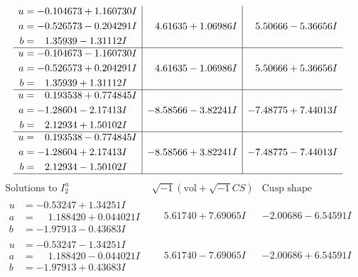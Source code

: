 \documentclass[1p]{elsarticle_modified}
\theoremstyle{definition}
\newcommand{\I}{\sqrt{-1}}
\begin{document}
$$\begin{array}{c|c|c}
\begin{aligned}
u &= -0.104673 + 1.160730 I \\
a &= -0.526573 - 0.204291 I \\
b &= \phantom{-}1.35939 - 1.31112 I\end{aligned}
 & \phantom{-}4.61635 + 1.06986 I & \phantom{-}5.50666 - 5.36656 I \\ \hline\begin{aligned}
u &= -0.104673 - 1.160730 I \\
a &= -0.526573 + 0.204291 I \\
b &= \phantom{-}1.35939 + 1.31112 I\end{aligned}
 & \phantom{-}4.61635 - 1.06986 I & \phantom{-}5.50666 + 5.36656 I \\ \hline\begin{aligned}
u &= \phantom{-}0.193538 + 0.774845 I \\
a &= -1.28604 - 2.17413 I \\
b &= \phantom{-}2.12934 + 1.50102 I\end{aligned}
 & -8.58566 - 3.82241 I & -7.48775 + 7.44013 I \\ \hline\begin{aligned}
u &= \phantom{-}0.193538 - 0.774845 I \\
a &= -1.28604 + 2.17413 I \\
b &= \phantom{-}2.12934 - 1.50102 I\end{aligned}
 & -8.58566 + 3.82241 I & -7.48775 - 7.44013 I\\
 \hline 
 \end{array}$$\newpage$$\begin{array}{c|c|c}  
\text{Solutions to }I^u_{2}& \I (\text{vol} + \sqrt{-1}CS) & \text{Cusp shape}\\
 \hline 
\begin{aligned}
u &= -0.53247 + 1.34251 I \\
a &= \phantom{-}1.188420 + 0.044021 I \\
b &= -1.97913 - 0.43683 I\end{aligned}
 & \phantom{-}5.61740 + 7.69065 I & -2.00686 - 6.54591 I \\ \hline\begin{aligned}
u &= -0.53247 - 1.34251 I \\
a &= \phantom{-}1.188420 - 0.044021 I \\
b &= -1.97913 + 0.43683 I\end{aligned}
 & \phantom{-}5.61740 - 7.69065 I & -2.00686 + 6.54591 I \\ \hline\begin{aligned}

\end{aligned}
\end{array}$$
\end{document}
